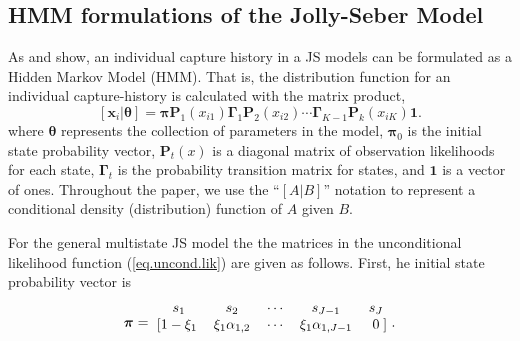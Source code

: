 \documentclass[12pt]{article}
\newcommand{\bx}{\ensuremath{\mathbf{x}}}
\newcommand{\bP}{\ensuremath{\mathbf{P}}}
\newcommand{\bpi}{\ensuremath{\boldsymbol{\pi}}}
\newcommand{\bG}{\ensuremath{\boldsymbol{\Gamma}}}
\newcommand{\bt}{\ensuremath{\boldsymbol{\theta}}}
\begin{document}
\subsection{HMM formulations of the Jolly-Seber Model}

 As \cite{glennie2019open} and \cite{mcclintock2020uncovering} show, an individual capture history in a JS models can be formulated as a Hidden Markov Model (HMM). That is, the distribution function for an individual capture-history is calculated with the matrix product,
%
\begin{equation}
\label{eq.uncond.lik}
[\bx_i|\bt] = \bpi\bP_1(x_{i1})\bG_1\bP_2(x_{i2}) \cdots \bG_{K-1}\bP_k(x_{iK})\mathbf{1}.
\end{equation}
where $\bt$ represents the collection of parameters in the model, $\bpi_0$ is the initial state probability vector, $\bP_t(x)$ is a diagonal matrix of observation likelihoods for each state, $\bG_t$ is the probability transition matrix for states, and $\mathbf{1}$ is a vector of ones. Throughout the paper, we use the ``$[A|B]$'' notation to represent a conditional density (distribution) function of $A$ given $B$. 


For the general multistate JS model the the matrices in the unconditional likelihood function (\ref{eq.uncond.lik}) are given as follows. First, he initial state probability vector is 
%
\[
\bpi = \begin{blockarray}{cccccc} 
s_1 & s_2 & \cdots & s_{J-1} & s_J \\
\begin{block}{[cccccc]}
1-\xi_1 & \xi_1\alpha_{1,2} & \cdots & \xi_1\alpha_{1,J-1} & 0 \\
\end{block}
\end{blockarray}.
\]
% 
\end{document}
